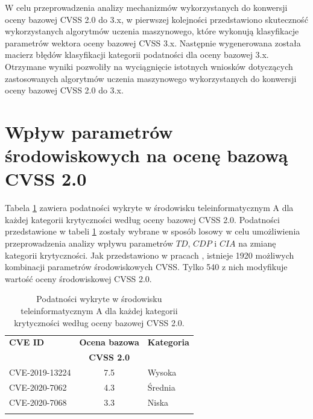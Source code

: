 \bigbreak
W celu przeprowadzenia analizy mechanizmów wykorzystanych do konwersji oceny bazowej CVSS 2.0 do 3.x, w pierwszej kolejności przedstawiono skuteczność wykorzystanych algorytmów uczenia maszynowego, które wykonują klasyfikacje parametrów wektora oceny bazowej CVSS 3.x. Następnie wygenerowana została macierz błędów klasyfikacji kategorii podatności dla oceny bazowej 3.x. Otrzymane wyniki pozwoliły na wyciągnięcie istotnych wniosków dotyczących zastosowanych algorytmów uczenia maszynowego wykorzystanych do konwersji oceny bazowej CVSS 2.0 do 3.x.


\section{Wpływ parametrów środowiskowych na ocenę bazową CVSS 2.0}
\label{sec:wplyw_cvss2}
Tabela \ref{tab:wplyw:env_a:cve_cvss_2} zawiera podatności wykryte w środowisku teleinformatycznym A dla każdej kategorii krytyczności według oceny bazowej CVSS 2.0. Podatności przedstawione w tabeli \ref{tab:wplyw:env_a:cve_cvss_2} zostały wybrane w sposób losowy w celu umożliwienia przeprowadzenia analizy wpływu parametrów $TD$, $CDP$ i $CIA$ na zmianę kategorii krytyczności. Jak przedstawiono w pracach \cite{gallon2010impact, li2015study}, istnieje 1920 możliwych kombinacji parametrów środowiskowych CVSS. Tylko 540 z nich modyfikuje wartość oceny środowiskowej CVSS 2.0.

\begin{table}[tbh]
\caption{Podatności wykryte w środowisku teleinformatycznym A dla każdej kategorii krytyczności według oceny bazowej CVSS 2.0.}
\begin{center}
\label{tab:wplyw:env_a:cve_cvss_2}
\begin{tabular}{lcl}
\hline \noalign {\smallskip}
\textbf{CVE ID}  & \textbf{Ocena bazowa} & \textbf{Kategoria} \\
   & \textbf{CVSS 2.0} &   \\
\hline \noalign {\smallskip}
CVE-2019-13224 & 7.5 & Wysoka \\
CVE-2020-7062  & 4.3 & Średnia  \\
CVE-2020-7068  & 3.3 & Niska \\
\hline \noalign {\smallskip}
\end{tabular}
\end{center}
\end{table}

